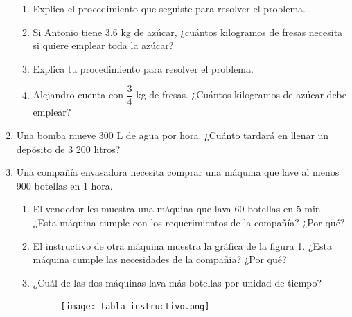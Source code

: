 \begin{enumerate}
\begin{enumerate}
              \item Explica el procedimiento que seguiste para resolver el problema.
              \item Si Antonio tiene 3.6 kg de azúcar, ¿cuántos kilogramos de fresas necesita si quiere emplear toda la azúcar?
              \item Explica tu procedimiento para resolver el problema.
              \item Alejandro cuenta con $\dfrac{3}{4}$ kg de fresas. ¿Cuántos kilogramos de azúcar debe emplear?
          \end{enumerate}
    \item Una bomba mueve 300 L de agua por hora. ¿Cuánto tardará en llenar un depósito de 3 200 litros?
    \item Una compañía envasadora necesita comprar una máquina que lave al menos 900
          botellas en 1 hora.
          \begin{enumerate}
              \item El vendedor les muestra una máquina que lava 60 botellas en 5 min. ¿Esta máquina cumple con los requerimientos de la compañía? ¿Por qué?
              \item El instructivo de otra máquina muestra la gráfica de
                    la figura \ref{fig:tabla_instructivo}. ¿Esta máquina cumple las necesidades de la compañía? ¿Por qué?

              \item ¿Cuál de las dos máquinas lava más botellas por unidad de tiempo?
                    \begin{figure}[H]
                        \centering
                        \texttt{[image: tabla\_instructivo.png]}
                        \label{fig:tabla_instructivo}
                    \end{figure}

          \end{enumerate}
\end{enumerate}

